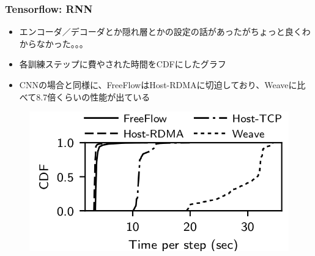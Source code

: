 \documentclass[dvipdfmx,9pt,notheorems]{beamer}
\theoremstyle{definition}
\begin{document}
\begin{frame}\frametitle{Tensorflow: RNN}
	\begin{itemize}
		\item エンコーダ／デコーダとか隠れ層とかの設定の話があったがちょっと良くわからなかった。。。
		\item 各訓練ステップに費やされた時間をCDFにしたグラフ
		\item CNNの場合と同様に、FreeFlowはHost-RDMAに切迫しており、Weaveに比べて8.7倍くらいの性能が出ている
	\end{itemize}
  \begin{figure}[htb]
    \centering
		\includegraphics[scale=1]{fig/figure15-b.png}
  \end{figure}
\end{frame}
\end{document}
